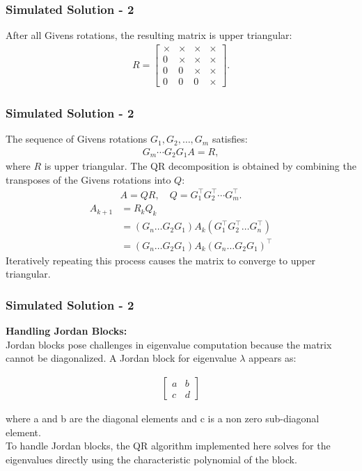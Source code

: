 \documentclass{beamer}
\theoremstyle{remark}
\numberwithin{equation}{section}
\begin{document}
\begin{frame}
	\frametitle{Simulated Solution - 2}
	After all Givens rotations, the resulting matrix is upper triangular:
	\begin{align}
		R = \begin{bmatrix}
			\times & \times & \times & \times \\
			0 & \times & \times & \times \\
			0 & 0 & \times & \times \\
			0 & 0 & 0 & \times
		\end{bmatrix}.
	\end{align}
\end{frame}
\begin{frame}
	\frametitle{Simulated Solution - 2}
	The sequence of Givens rotations $G_1, G_2, \dots, G_m$ satisfies:
	\begin{align}
		G_m \cdots G_2 G_1 A = R,
	\end{align}
	where \(R\) is upper triangular. The QR decomposition is obtained by combining the transposes of the Givens rotations into \(Q\):
	\begin{align}
		A = Q R, \quad Q = G_1^{\top} G_2^{\top} \cdots G_m^{\top}.
	\end{align}
	\begin{align}
		A_{k+1}&= R_k Q_k\\
		&=(G_n \dots G_2 G_1)A_k(G_1^{\top}G_2^{\top}\dots G_n^{\top})\\
		&= (G_n \dots G_2 G_1)A_k(G_n \dots G_2 G_1)^{\top}
	\end{align}
	Iteratively repeating this process causes the matrix to converge to upper triangular.\\
\end{frame}
\begin{frame}
	\frametitle{Simulated Solution - 2}
	\textbf{Handling Jordan Blocks:}\\
Jordan blocks pose challenges in eigenvalue computation because the matrix cannot be diagonalized. A Jordan block for eigenvalue \(\lambda\) appears as:

\begin{align}
\begin{bmatrix}
a & b \\
c & d
\end{bmatrix}
\end{align}

where a and b are the diagonal elements and c is a non zero sub-diagonal element.\\
To handle Jordan blocks, the QR algorithm implemented here solves for the eigenvalues directly using the characteristic polynomial of the block. 
\end{frame}
\end{document}
